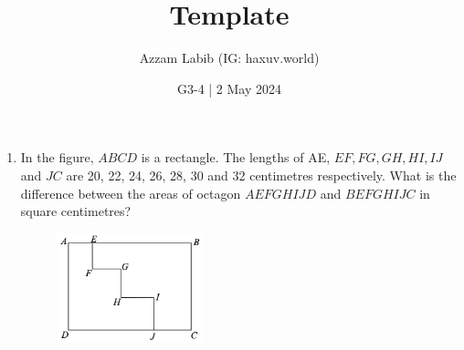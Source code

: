\documentclass[11pt]{scrartcl}
\title{Template}
\author{Azzam Labib (IG: haxuv.world)}
\date{G3-4 | 2 May 2024}
\begin{document}
\maketitle

\begin{enumerate}
    \section{Logical Thinking and Combinatorics}


    \item In the figure, $ABCD$ is a rectangle. The lengths of AE, $EF, FG, GH, HI, IJ$ and $JC$ are 20, 22, 24, 26, 28, 30 and 32 centimetres respectively. What is the difference between the areas of octagon $AEFGHIJD$ and $BEFGHIJC$ in square centimetres?
    \begin{figure}[h]
        \centering
        \includegraphics[width=0.4\textwidth]{StarGen/AIMO Trial G3-4 2024/octagon.png}
    \end{figure}
\end{enumerate}
\end{document}
